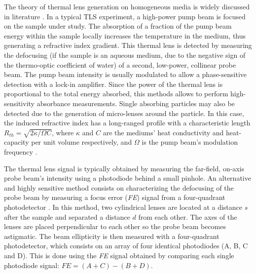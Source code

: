 \documentclass[9pt,twocolumn,twoside]{osajnl}
\newcommand{\FE}{\textit{FE}}
\begin{document}
The theory of thermal lens generation on homogeneous media is widely discussed in literature \cite{Bialkowski2019}. In a typical TLS experiment, a high-power pump beam is focused on the sample under study. The absorption of a fraction of the pump beam energy within the sample locally increases the temperature in the medium, thus generating a refractive index gradient. This thermal lens is detected by measuring the defocusing (if the sample is an aqueous medium, due to the negative sign of the thermo-optic coefficient of water) of a second, low-power, collinear probe beam. The pump beam intensity is usually modulated to allow a phase-sensitive detection with a lock-in amplifier. Since the power of the thermal lens is proportional to the total energy absorbed, this methods allows to perform high-sensitivity absorbance measurements. Single absorbing particles may also be detected due to the generation of micro-lenses around the particle. In this case, the induced refractive index has a long-ranged profile with a characteristic length $R_{th} = \sqrt{2 \kappa / \Omega C}$, where $\kappa$ and $C$ are the mediums' heat conductivity and heat-capacity per unit volume respectively, and $\Omega$ is the pump beam's modulation frequency \cite{Selmke2015}.


The thermal lens signal is typically obtained by measuring the far-field, on-axis probe beam's intensity using a photodiode behind a small pinhole. An alternative and highly sensitive method consists on characterizing the defocusing of the probe beam by measuring a focus error (\FE{}) signal from a four-quadrant photodetector \cite{Domene2017, ZaldivarEscola2019}. In this method, two cylindrical lenses are located at a distance $s$ after the sample and separated a distance $d$ from each other. The axes of the lenses are placed perpendicular to each other so the probe beam becomes astigmatic. The beam ellipticity is then measured with a four-quadrant photodetector, which consists on an array of four identical photodiodes (A, B, C and D). This is done using the \FE{} signal obtained by comparing each single photodiode signal: $\FE{} = (A+C)-(B+D)$.
\end{document}
